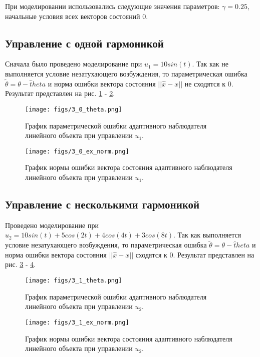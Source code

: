 \documentclass{article}
\begin{document}
При моделировании использовались следующие значения параметров: $\gamma = 0.25$, начальные условия всех векторов состояний 0.
\newpage
\subsection{Управление с одной гармоникой}
Сначала было проведено моделирование при \(u_1 = 10 sin(t)\). Так как не выполняется условие незатухающего возбуждения, то параметрическая ошибка \(\tilde \theta = \theta - \hat theta\) и норма ошибки вектора состояния \(||\hat x - x||\) не сходятся к 0. Результат представлен на рис. \ref{fig:1_theta} - \ref{fig:1_xnorm}.
\begin{figure}[h!]
  \centering
  \texttt{[image: figs/3\_0\_theta.png]}
  \caption{График параметрической ошибки адаптивного наблюдателя линейного объекта при управлении \(u_1\).} 
  \label{fig:1_theta}
\end{figure}
\begin{figure}[h!]
  \centering
  \texttt{[image: figs/3\_0\_ex\_norm.png]}
  \caption{График нормы ошибки вектора состояния адаптивного наблюдателя линейного объекта при управлении \(u_1\).} 
  \label{fig:1_xnorm}
\end{figure}
\FloatBarrier
\newpage

\subsection{Управление с несколькими гармоникой}
Проведено моделирование при \(u_2 = 10 sin(t) + 5 cos(2t) + 4cos(4t) + 3cos(8t)\). Так как выполняется условие незатухающего возбуждения, то параметрическая ошибка \(\tilde \theta = \theta - \hat theta\) и норма ошибки вектора состояния \(||\hat x - x||\) сходятся к 0. Результат представлен на рис. \ref{fig:2_theta} - \ref{fig:2_xnorm}.
\begin{figure}[h!]
  \centering
  \texttt{[image: figs/3\_1\_theta.png]}
  \caption{График параметрической ошибки адаптивного наблюдателя линейного объекта при управлении \(u_2\).} 
  \label{fig:2_theta}
\end{figure}
\begin{figure}[h!]
  \centering
  \texttt{[image: figs/3\_1\_ex\_norm.png]}
  \caption{График нормы ошибки вектора состояния адаптивного наблюдателя линейного объекта при управлении \(u_2\).} 
  \label{fig:2_xnorm}
\end{figure}
\FloatBarrier
\newpage
\end{document}
